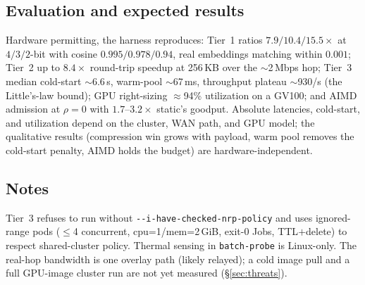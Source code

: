 \documentclass[conference]{IEEEtran}
\begin{document}
\subsection{Evaluation and expected results}
Hardware permitting, the harness reproduces: Tier~1 ratios $7.9/10.4/15.5\times$ at $4/3/2$-bit with
cosine $0.995/0.978/0.94$, real embeddings matching within $0.001$; Tier~2 up to $8.4\times$
round-trip speedup at 256\,KB over the $\sim$2\,Mbps hop; Tier~3 median cold-start $\sim$6.6\,s,
warm-pool $\sim$67\,ms, throughput plateau $\sim$930/s (the Little's-law bound); GPU right-sizing
$\approx$94\% utilization on a GV100; and AIMD admission at $\rho{=}0$ with $1.7$--$3.2\times$
static's goodput. Absolute latencies, cold-start, and utilization depend on the cluster, WAN path,
and GPU model; the qualitative results (compression win grows with payload, warm pool removes the
cold-start penalty, AIMD holds the budget) are hardware-independent.

\subsection{Notes}
Tier~3 refuses to run without \texttt{-{}-i-have-checked-nrp-policy} and uses ignored-range pods
($\le$4 concurrent, cpu=1/mem=2\,GiB, exit-0 Jobs, TTL${+}$delete) to respect shared-cluster policy.
Thermal sensing in \texttt{batch-probe} is Linux-only. The real-hop bandwidth is one overlay path
(likely relayed); a cold image pull and a full GPU-image cluster run are not yet measured
(\S\ref{sec:threats}).



\end{document}
